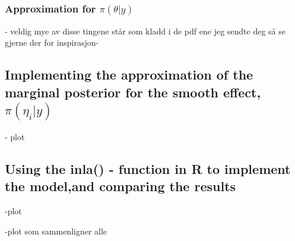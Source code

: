  
\subsubsection{Approximation for $\pi(\theta|y)$}
- veldig mye av disse tingene står som kladd i de pdf ene jeg sendte deg så se gjerne der for inspirasjon- 
\subsection{Implementing the approximation of the marginal posterior for the smooth effect, $\pi(\eta_i | y)$}
- plot
\subsection{Using the inla() - function in R to implement the model,and comparing the results}
-plot 


-plot som sammenligner alle
